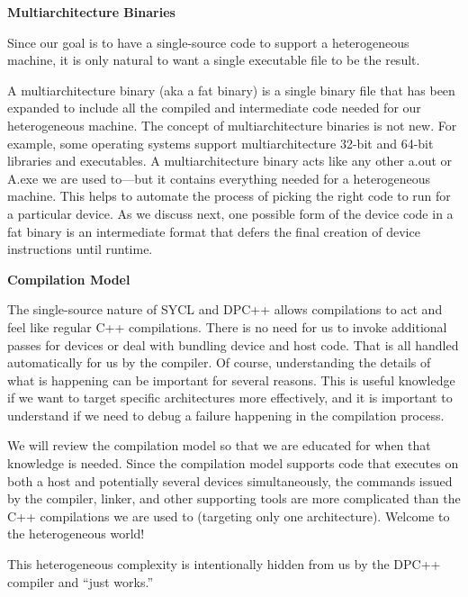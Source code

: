\hspace*{\fill} \par %
\textbf{Multiarchitecture Binaries}

Since our goal is to have a single-source code to support a heterogeneous machine, it is only natural to want a single executable file to be the result.\par

A multiarchitecture binary (aka a fat binary) is a single binary file that has been expanded to include all the compiled and intermediate code needed for our heterogeneous machine. The concept of multiarchitecture binaries is not new. For example, some operating systems support multiarchitecture 32-bit and 64-bit libraries and executables. A multiarchitecture binary acts like any other a.out or A.exe we are used to—but it contains everything needed for a heterogeneous machine. This helps to automate the process of picking the right code to run for a particular device. As we discuss next, one possible form of the device code in a fat binary is an intermediate format that defers the final creation of device instructions until runtime.\par

\hspace*{\fill} \par %
\textbf{Compilation Model}

The single-source nature of SYCL and DPC++ allows compilations to act and feel like regular C++ compilations. There is no need for us to invoke additional passes for devices or deal with bundling device and host code. That is all handled automatically for us by the compiler. Of course, understanding the details of what is happening can be important for several reasons. This is useful knowledge if we want to target specific architectures more effectively, and it is important to understand if we need to debug a failure happening in the compilation process.\par

We will review the compilation model so that we are educated for when that knowledge is needed. Since the compilation model supports code that executes on both a host and potentially several devices simultaneously, the commands issued by the compiler, linker, and other supporting tools are more complicated than the C++ compilations we are used to (targeting only one architecture). Welcome to the heterogeneous world!\par

This heterogeneous complexity is intentionally hidden from us by the DPC++ compiler and “just works.”\par

